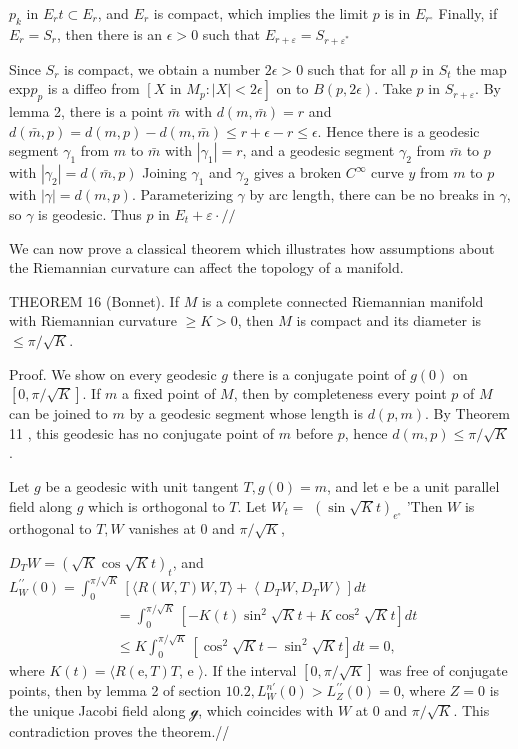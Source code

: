 \documentclass[10pt]{article}
\begin{document}
$p_{k}$ in $E_{r} t \subset E_{r}$, and $E_{r}$ is compact, which implies the limit $p$ is in $E_{r^{\circ}}$ Finally, if $E_{r}=S_{r}$, then there is an $\epsilon>0$ such that $E_{r+\varepsilon}=S_{r+\varepsilon^{*}}$

Since $S_{r}$ is compact, we obtain a number $2 \epsilon>0$ such that for all $p$ in $S_{t}$ the map exp$p_{p}$ is a diffeo from $\left[X\right.$ in $\left.M_{p}:|X|<2 \epsilon\right]$ on to $B(p, 2 \epsilon)$. Take $p$ in $S_{r+\varepsilon}$. By lemma 2, there is a point $\bar{m}$ with $d(m, \bar{m})=r$ and $d(\bar{m}, p)=d(m, p)-d(m, \bar{m}) \leq r+\epsilon-r \leq \epsilon$. Hence there is a geodesic segment $\gamma_{1}$ from $m$ to $\bar{m}$ with $\left|\gamma_{1}\right|=r$, and a geodesic segment $\gamma_{2}$ from $\bar{m}$ to $p$ with $\left|\gamma_{2}\right|=d(\bar{m}, p)$ Joining $\gamma_{1}$ and $\gamma_{2}$ gives a broken $C^{\infty}$ curve $y$ from $m$ to $p$ with $|\gamma|=d(m, p)$. Parameterizing $\gamma$ by arc length, there can be no breaks in $\gamma$, so $\gamma$ is geodesic. Thus $p$ in $E_{t}+\varepsilon \cdot / /$

We can now prove a classical theorem which illustrates how assumptions about the Riemannian curvature can affect the topology of a manifold.

THEOREM 16 (Bonnet). If $M$ is a complete connected Riemannian manifold with Riemannian curvature $\geq K>0$, then $M$ is compact and its diameter is $\leq \pi / \sqrt{K}$.

Proof. We show on every geodesic $g$ there is a conjugate point of $g(0)$ on $[0, \pi / \sqrt{K}]$. If $m$ a fixed point of $M$, then by completeness every point $p$ of $M$ can be joined to $m$ by a geodesic segment whose length is $d(p, m)$. By Theorem 11 , this geodesic has no conjugate point of $m$ before $p$, hence $d(m, p) \leq \pi / \sqrt{K}$.

Let $g$ be a geodesic with unit tangent $T, g(0)=m$, and let e be a unit parallel field along $g$ which is orthogonal to $T$. Let $W_{t}=$ $(\sin \sqrt{K} t)_{e^{\circ}}$ 'Then $W$ is orthogonal to $T, W$ vanishes at 0 and $\pi / \sqrt{K}$,

$D_{T} W=(\sqrt{K} \cos \sqrt{K} t)_{t}$, and $L_{W}^{\prime \prime}(0)=\int_{0}^{\pi / \sqrt{K}}\left[\langle R(W, T) W, T\rangle+\left\langle D_{T} W, D_{T} W\right\rangle\right] d t$
$$
\begin{aligned}
&=\int_{0}^{\pi / \sqrt{K}}\left[-K(t) \sin ^{2} \sqrt{K} t+K \cos ^{2} \sqrt{K} t\right] d t \\
&\leq K \int_{0}^{\pi / \sqrt{K}}\left[\cos ^{2} \sqrt{K} t-\sin ^{2} \sqrt{K} t\right] d t=0,
\end{aligned}
$$
where $K(t)=\langle R(\mathrm{e}, T) T$, e $\rangle$. If the interval $[0, \pi / \sqrt{K}]$ was free of conjugate points, then by lemma 2 of section $10.2, L_{W}^{n \prime}(0)>L_{Z}^{\prime \prime}(0)=0$, where $Z=0$ is the unique Jacobi field along $\mathscr{g}$, which coincides with $W$ at 0 and $\pi / \sqrt{K}$. This contradiction proves the theorem.//
\end{document}
